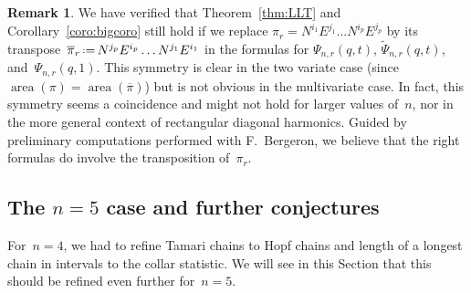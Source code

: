\documentclass{amsart}
\theoremstyle{definition}
\newtheorem{remark}[theorem]{Remark}
\newcommand{\eqdef}{\mbox{\,\raisebox{0.2ex}{\scriptsize\ensuremath{\mathrm:}}\ensuremath{=}\,}} %
\newcommand{\area}{\operatorname{area}} %
\begin{document}
\begin{remark}
We have verified that Theorem~\ref{thm:LLT} and Corollary~\ref{coro:bigcoro} still hold if we replace $\pi_r = N^{i_1} E^{j_1} \dots N^{i_p} E^{j_p}$ by its transpose~$\overline{\pi}_r \eqdef N^{j_p} E^{i_p} \dots N^{j_1} E^{i_1}$ in the formulas for $\Psi_{n,r}(q,t)$, $\widetilde \Psi_{n,r}(q,t)$, and~$\Psi_{n,r}(q,1)$.
This symmetry is clear in the two variate case (since~${\area(\pi) = \area(\overline{\pi})}$) but is not obvious in the multivariate case.
In fact, this symmetry seems a coincidence and might not hold for larger values of~$n$, nor in the more general context of rectangular diagonal harmonics.
Guided by preliminary computations performed with F.~Bergeron, we believe that the right formulas do involve the transposition of~$\pi_r$.
\end{remark}


\subsection{The $n=5$ case and further conjectures}

For~$n = 4$, we had to refine Tamari chains to Hopf chains and length of a longest chain in intervals to the collar statistic.
We will see in this Section that this should be refined even further for~$n = 5$.
\end{document}
